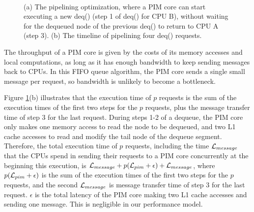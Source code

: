 \begin{figure}[ht!]
\centering
{}
\\

\caption{(a) The pipelining optimization, where a PIM core can start executing 
a new deq() (step 1 of deq() for CPU B), without waiting for the dequeued node of 
the previous deq() to return to CPU A (step 3). 
(b) The timeline of pipelining four deq() requests.}
\label{figure:queue_pipeline}
\end{figure}
 
The throughput of a PIM core is given by the costs of its memory accesses and local computations, 
as long as it has enough bandwidth to keep sending messages back to CPUs.  
In this FIFO queue algorithm, the PIM core sends a single small message per request, 
so bandwidth is unlikely to become a bottleneck. 

Figure \ref{figure:queue_pipeline}(b) illustrates that 
the execution time of $p$ requests is the sum of the execution times of the first two steps 
for the $p$ requests, plus the message transfer time of step 3 for the last request.   
During steps 1-2 of a dequeue, the PIM core only makes one memory access to read the node 
to be dequeued, and two L1 cache accesses to read and modify the tail node of the dequeue segment.   
Therefore, the total execution time of $p$ requests, 
including the time $\mathcal{L}_{message}$ that the CPUs spend in sending their requests to a PIM core concurrently at the beginning this execution, 
is $\mathcal{L}_{message} + p(\mathcal{L}_{pim} + \epsilon) + \mathcal{L}_{message}$, 
where $p(\mathcal{L}_{pim} + \epsilon)$ is the sum of the execution times of the first two steps 
for the $p$ requests, and the second $\mathcal{L}_{message}$ is message transfer time of step 3 for the last request. 
$\epsilon$ is the total latency of the PIM core making two L1 cache accesses and sending one message.  
This is negligible in our performance model. 

